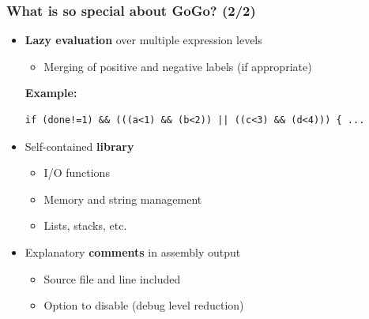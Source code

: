 \documentclass{beamer}
\begin{document}
\begin{frame}[containsverbatim]
    \frametitle{What is so special about GoGo? (2/2)}
    \begin{itemize}
        \item \textbf{Lazy evaluation} over multiple expression levels\\
            \begin{itemize}
                \item Merging of positive and negative labels (if appropriate)
            \end{itemize} 
            \tiny \textbf{Example:} \normalsize
            \begin{lstlisting}
if (done!=1) && (((a<1) && (b<2)) || ((c<3) && (d<4))) { ...
            \end{lstlisting}
        \item Self-contained \textbf{library}
            \begin{itemize}
                \item I/O functions
                \item Memory and string management
                \item Lists, stacks, etc.
            \end{itemize}
        \item  Explanatory \textbf{comments} in assembly output\\
            \begin{itemize}
                \item Source file and line included
                \item Option to disable (debug level reduction)
            \end{itemize}
    \end{itemize}
\end{frame}
\end{document}
